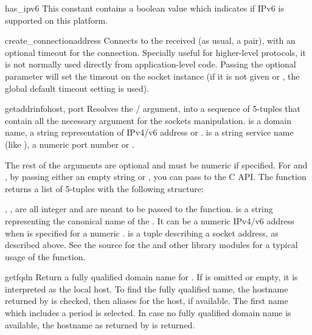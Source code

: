 \begin{datadesc}{has_ipv6}
This constant contains a boolean value which indicates if IPv6 is
supported on this platform.
\end{datadesc}

\begin{funcdesc}{create_connection}{address}
Connects to the  received (as usual, a 
pair), with an optional timeout for the connection.  Specially useful for
higher-level protocols, it is not normally used directly from
application-level code.  Passing the optional  parameter
will set the timeout on the socket instance (if it is not given or
, the global default timeout setting is used).
\end{funcdesc}

\begin{funcdesc}{getaddrinfo}{host, port}
Resolves the / argument, into a sequence of
5-tuples that contain all the necessary argument for the sockets
manipulation.  is a domain name, a string representation of
IPv4/v6 address or .
 is a string service name (like ), a numeric
port number or .

The rest of the arguments are optional and must be numeric if
specified.  For  and , by passing either an empty
string or , you can pass  to the C API.  The
 function returns a list of 5-tuples with
the following structure:


, ,  are all integer and are meant to
be passed to the  function.
 is a string representing the canonical name of the .
It can be a numeric IPv4/v6 address when  is specified
for a numeric .
 is a tuple describing a socket address, as described above.
See the source for the  and other library modules
for a typical usage of the function.
\end{funcdesc}

\begin{funcdesc}{getfqdn}{}
Return a fully qualified domain name for .
If  is omitted or empty, it is interpreted as the local
host.  To find the fully qualified name, the hostname returned by
 is checked, then aliases for the host, if
available.  The first name which includes a period is selected.  In
case no fully qualified domain name is available, the hostname as
returned by  is returned.
\end{funcdesc}

